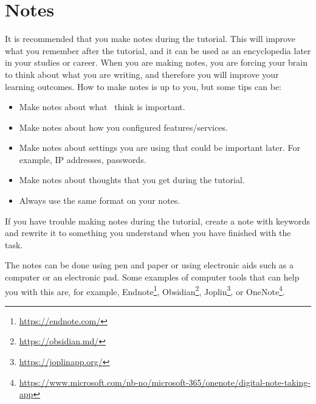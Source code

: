 \newpage

\section{Notes} \label{notes}
It is recommended that you make notes during the tutorial. This will improve what you remember after the tutorial, and it can be used as an encyclopedia later in your studies or career. When you are making notes, you are forcing your brain to think about what you are writing, and therefore you will improve your learning outcomes. How to make notes is up to you, but some tips can be:
\begin{itemize}
    \item Make notes about what \ think is important.
    \item Make notes about how you configured features/services.
    \item Make notes about settings you are using that could be important later. For example, IP addresses, passwords.
    \item Make notes about thoughts that you get during the tutorial.
    \item Always use the same format on your notes.
\end{itemize}

If you have trouble making notes during the tutorial, create a note with keywords and rewrite it to something you understand when you have finished with the task.

The notes can be done using pen and paper or using electronic aids such as a computer or an electronic pad. Some examples of computer tools that can help you with this are, for example, Endnote\footnote{\url{https://endnote.com/}}, Obsidian\footnote{\url{https://obsidian.md/}}, Joplin\footnote{\url{https://joplinapp.org/}}, or OneNote\footnote{\url{https://www.microsoft.com/nb-no/microsoft-365/onenote/digital-note-taking-app}}.


